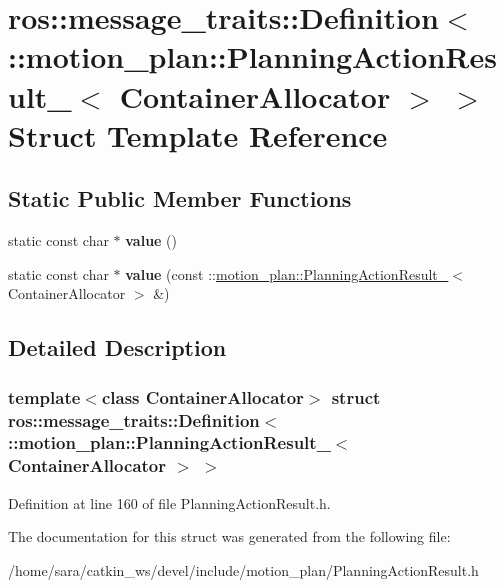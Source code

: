 \hypertarget{structros_1_1message__traits_1_1Definition_3_01_1_1motion__plan_1_1PlanningActionResult___3_01ContainerAllocator_01_4_01_4}{}\section{ros\+:\+:message\+\_\+traits\+:\+:Definition$<$ \+:\+:motion\+\_\+plan\+:\+:Planning\+Action\+Result\+\_\+$<$ Container\+Allocator $>$ $>$ Struct Template Reference}
\label{structros_1_1message__traits_1_1Definition_3_01_1_1motion__plan_1_1PlanningActionResult___3_01ContainerAllocator_01_4_01_4}
\subsection*{Static Public Member Functions}
\begin{DoxyCompactItemize}
\item 
\mbox{\label{structros_1_1message__traits_1_1Definition_3_01_1_1motion__plan_1_1PlanningActionResult___3_01ContainerAllocator_01_4_01_4_ada7612b184868271eeaed72ea52e3873}} 
static const char $\ast$ {\bfseries value} ()
\item 
\mbox{\label{structros_1_1message__traits_1_1Definition_3_01_1_1motion__plan_1_1PlanningActionResult___3_01ContainerAllocator_01_4_01_4_a1dd32dc59bb8e8f5b3946b29387894aa}} 
static const char $\ast$ {\bfseries value} (const \+::\hyperlink{structmotion__plan_1_1PlanningActionResult__}{motion\+\_\+plan\+::\+Planning\+Action\+Result\+\_\+}$<$ Container\+Allocator $>$ \&)
\end{DoxyCompactItemize}


\subsection{Detailed Description}
\subsubsection*{template$<$class Container\+Allocator$>$\newline
struct ros\+::message\+\_\+traits\+::\+Definition$<$ \+::motion\+\_\+plan\+::\+Planning\+Action\+Result\+\_\+$<$ Container\+Allocator $>$ $>$}



Definition at line 160 of file Planning\+Action\+Result.\+h.



The documentation for this struct was generated from the following file\+:\begin{DoxyCompactItemize}
\item 
/home/sara/catkin\+\_\+ws/devel/include/motion\+\_\+plan/Planning\+Action\+Result.\+h\end{DoxyCompactItemize}
